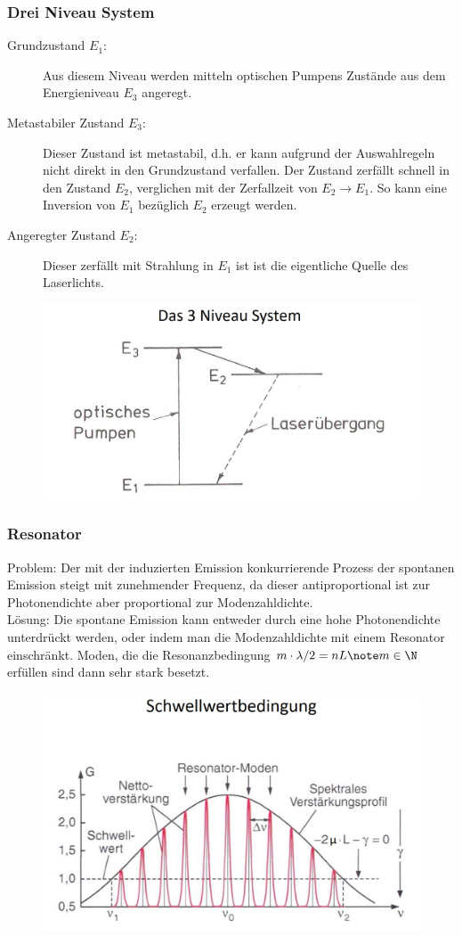 \documentclass[twocolumn]{summery_4.1}
\begin{document}
\subsubsection{Drei Niveau System}
\begin{description}
    \item[Grundzustand \(E_1\):] Aus diesem Niveau werden mitteln optischen Pumpens Zustände aus dem Energieniveau \(E_3\) angeregt.
    \item[Metastabiler Zustand \(E_3\):] Dieser Zustand ist metastabil, d.h. er kann aufgrund der Auswahlregeln nicht direkt in den Grundzustand verfallen. Der Zustand zerfällt schnell in den Zustand \(E_2\), verglichen mit der Zerfallzeit von \(E_2\to E_1\). So kann eine Inversion von \(E_1\) bezüglich 
    \(E_2\) erzeugt werden.
    \item[Angeregter Zustand \(E_2\):] Dieser zerfällt mit Strahlung in \(E_1\) ist ist die eigentliche Quelle des Laserlichts.   
\end{description}
\begin{figure}[H]
    \centering
    \includegraphics[width=.49\textwidth]{3_Niveau_Laser.png}
\end{figure}

\subsubsection{Resonator}
Problem: Der mit der induzierten Emission konkurrierende Prozess der spontanen Emission steigt mit zunehmender Frequenz, da dieser antiproportional ist zur Photonendichte aber proportional zur Modenzahldichte.\\

Lösung: Die spontane Emission kann entweder durch eine hohe Photonendichte unterdrückt werden, oder indem man die Modenzahldichte mit einem Resonator einschränkt. Moden, die die Resonanzbedingung \(m\cdot \lambda/2 = n L\note m\in\N \) erfüllen sind dann sehr stark besetzt.

\begin{figure}[H]
    \centering
    \includegraphics[width=.49\textwidth]{Schwellwertbedingung.png}
\end{figure}
\end{document}
